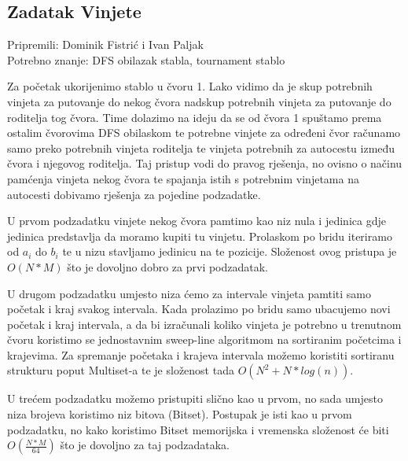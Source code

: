 \subsection*{Zadatak Vinjete}
\textsf{Pripremili: Dominik Fistrić i Ivan Paljak}\\
\textsf{Potrebno znanje: DFS obilazak stabla, tournament stablo}

Za početak ukorijenimo stablo u čvoru 1. Lako vidimo da je skup potrebnih vinjeta za putovanje do nekog čvora nadskup potrebnih vinjeta za putovanje do roditelja tog čvora. Time dolazimo na ideju da se od čvora 1 spuštamo prema ostalim čvorovima DFS obilaskom te potrebne vinjete za određeni čvor računamo samo preko potrebnih vinjeta roditelja te vinjeta potrebnih za autocestu između čvora i njegovog roditelja. Taj pristup vodi do pravog rješenja, no ovisno o načinu pamćenja vinjeta nekog čvora te spajanja istih s potrebnim vinjetama na autocesti dobivamo rješenja za pojedine podzadatke.

U prvom podzadatku vinjete nekog čvora pamtimo kao niz nula i jedinica gdje jedinica predstavlja da moramo kupiti tu vinjetu. Prolaskom po bridu iteriramo od $a_i$ do $b_i$ te u nizu stavljamo jedinicu na te pozicije. Složenost ovog pristupa je $O(N * M)$ što je dovoljno dobro za prvi podzadatak.

U drugom podzadatku umjesto niza ćemo za intervale vinjeta pamtiti samo početak i kraj svakog intervala. Kada prolazimo po bridu samo ubacujemo novi početak i kraj intervala, a da bi izračunali koliko vinjeta je potrebno u trenutnom čvoru koristimo se jednostavnim sweep-line algoritmom na sortiranim početcima i krajevima. Za spremanje početaka i krajeva intervala možemo koristiti sortiranu strukturu poput Multiset-a te je složenost tada $O(N^2 + N * log(n))$.

U trećem podzadatku možemo pristupiti slično kao u prvom, no sada umjesto niza brojeva koristimo niz bitova (Bitset). Postupak je isti kao u prvom podzadatku, no kako koristimo Bitset memorijska i vremenska složenost će biti $O(\frac{N * M}{64})$ što je dovoljno za taj podzadataka.

